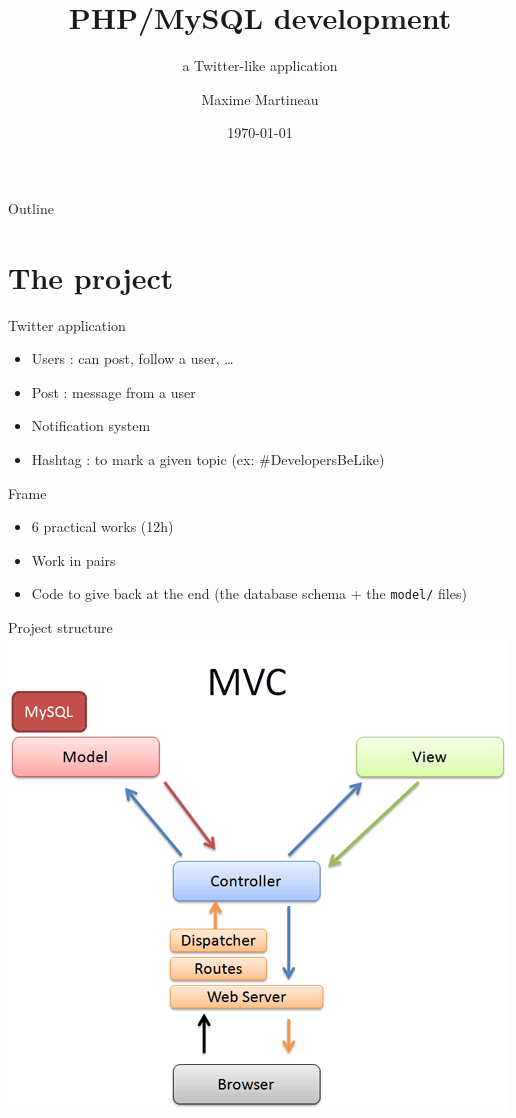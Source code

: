 \documentclass{beamer}
\title{PHP/MySQL development}
\subtitle{a Twitter-like application}
\author{Maxime Martineau}
\institute[Polytech Tours] %
{
    Polytech Tours Département Informatique  
}
\date{\today}
\begin{document}
\begin{frame}
  \titlepage
\end{frame}

\begin{frame}{Outline}
    \tableofcontents
\end{frame}

\section{The project}
\begin{frame}
    Twitter application
    
    \begin{itemize}
        \item Users : can post, follow a user, …
        \item Post : message from a user
        \item Notification system
        \item Hashtag : to mark a given topic (ex: \#DevelopersBeLike)
    \end{itemize}
\end{frame}

\begin{frame}{Frame}
\begin{itemize}
\item 6 practical works (12h)
\item Work in pairs
\item Code to give back at the end (the database schema + the \texttt{model/} files)
\end{itemize}
\end{frame}

\begin{frame}{Project structure}
\center
\includegraphics[scale=0.3]{images/mvc-rails.png}
\end{frame}
\end{document}
